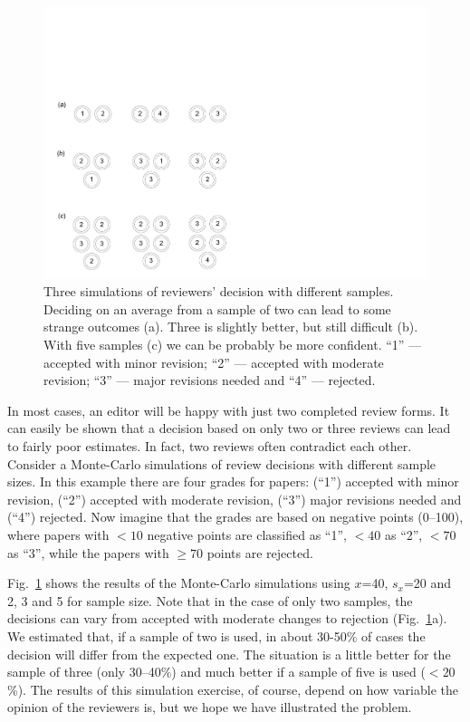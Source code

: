 \documentclass[graybox,envcountchap,sectrefs,UStrade]{svmono}
\begin{document}
\begin{figure}[htb]
\begin{center}
\includegraphics[width=.8\textwidth]{Fig_review_sim.pdf}
\caption{Three simulations of reviewers' decision with different samples. Deciding on an average from a sample of two can lead to some strange outcomes (a). Three is slightly better, but still difficult (b). With five samples (c) we can be probably be more confident. ``1'' --- accepted with minor revision; ``2'' --- accepted with moderate revision; ``3'' --- major revisions needed and ``4'' --- rejected.}
\label{F:sim}
\end{center}
\end{figure}

In most cases, an editor will be happy with just two completed review forms. It can easily be shown that a decision based on only two or three reviews can lead to fairly poor estimates. In fact, two reviews often contradict each other. Consider a Monte-Carlo simulations of review decisions with different sample sizes. In this example there are four grades for papers: (``1'') accepted with minor revision, (``2'') accepted with moderate revision, (``3'') major revisions needed and (``4'') rejected. Now imagine that the grades are based on negative points (0--100), where papers with $<10$ negative points are classified as ``1'', $<40$ as ``2'', $<70$ as ``3'', while the papers with $\geq 70$ points are rejected.\par

Fig.\@~\ref{F:sim} shows the results of the Monte-Carlo simulations using $x$=40, $s_x$=20 and 2, 3 and 5 for sample size. Note that in the case of only two samples, the decisions can vary from accepted with moderate changes to rejection (Fig.\@~\ref{F:sim}a). We estimated that, if a sample of two is used, in about 30-50\% of cases the decision will differ from the expected one. The situation is a little better for the sample of three (only 30--40\%) and much better if a sample of five is used ($<20$\%). The results of this simulation exercise, of course, depend on how variable the opinion of the reviewers is, but we hope we have illustrated the problem. \par
\end{document}
